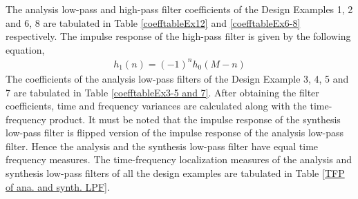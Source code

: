 The analysis low-pass and high-pass filter coefficients of the Design Examples 1, 2 and 6, 8 are tabulated in Table \ref{coefftableEx12} and \ref{coefftableEx6-8} respectively. The impulse response of the high-pass filter is given by the following equation,
\begin{eqnarray*}
h_1(n) = (-1)^n h_0(M - n)
\end{eqnarray*}
The coefficients of the analysis low-pass filters of the Design Example 3, 4, 5 and 7 are tabulated in Table \ref{coefftableEx3-5 and 7}. After obtaining the filter coefficients, time and frequency variances are calculated along with the time-frequency product. It must be noted that the impulse response of the synthesis low-pass filter is flipped version of the impulse response of the analysis low-pass filter. Hence the analysis and the synthesis low-pass filter have equal time frequency measures. The time-frequency localization measures of the analysis and synthesis low-pass filters of all the design examples are tabulated in Table \ref{TFP of ana. and synth. LPF}. 

